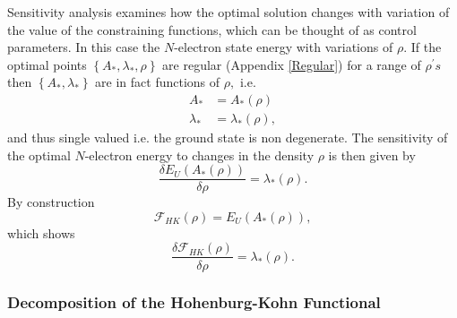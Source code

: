 \documentclass[aps,preprint]{revtex4}%
\begin{document}
Sensitivity analysis \cite{Hestenes75} examines how the optimal solution
changes with variation of the value of the constraining functions, which can
be thought of as control parameters. In this case the $N$-electron state
energy with variations of $\rho.$ If the optimal points $\left\{  A_{\ast
},\lambda_{\ast},\rho\right\}  $ are regular (Appendix \ref{Regular}) for a
range of $\rho^{\prime}s$ then $\left\{  A_{\ast},\lambda_{\ast}\right\}  $
are in fact functions of $\rho,$ i.e.
\begin{align}
A_{\ast} &  =A_{\ast}\left(  \rho\right)  \nonumber\\
\lambda_{\ast} &  =\lambda_{\ast}\left(  \rho\right)  ,
\end{align}
and thus single valued i.e. the ground state is non degenerate. The
sensitivity of the optimal $N$-electron energy to changes in the density
$\rho$ is then given by
\begin{equation}
\frac{\delta E_{U}\left(  A_{\ast}\left(  \rho\right)  \right)  }{\delta\rho
}=\lambda_{\ast}\left(  \rho\right)  .
\end{equation}
By construction
\begin{equation}
\mathcal{F}_{HK}\left(  \rho\right)  =E_{U}\left(  A_{\ast}\left(
\rho\right)  \right)  ,
\end{equation}
which shows
\begin{equation}
\frac{\delta\mathcal{F}_{HK}\left(  \rho\right)  }{\delta\rho}=\lambda_{\ast
}\left(  \rho\right)  .
\end{equation}


\subsubsection{Decomposition of the Hohenburg-Kohn Functional\label{DecompHK}}
\end{document}
